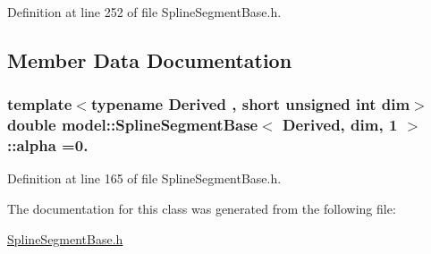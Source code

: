 Definition at line 252 of file Spline\+Segment\+Base.\+h.



\subsection{Member Data Documentation}
\hypertarget{classmodel_1_1_spline_segment_base_3_01_derived_00_01dim_00_011_01_4_ae6eb8a4386425c5dc3055f171f780a19}{}
\subsubsection[{alpha}]{\setlength{\rightskip}{0pt plus 5cm}template$<$typename Derived , short unsigned int dim$>$ double {\bf model\+::\+Spline\+Segment\+Base}$<$ Derived, {\bf dim}, 1 $>$\+::alpha =0.\hspace{0.3cm}{\ttfamily [static]}}\label{classmodel_1_1_spline_segment_base_3_01_derived_00_01dim_00_011_01_4_ae6eb8a4386425c5dc3055f171f780a19}


Definition at line 165 of file Spline\+Segment\+Base.\+h.



The documentation for this class was generated from the following file\+:\begin{DoxyCompactItemize}
\item 
\hyperlink{_spline_segment_base_8h}{Spline\+Segment\+Base.\+h}\end{DoxyCompactItemize}
